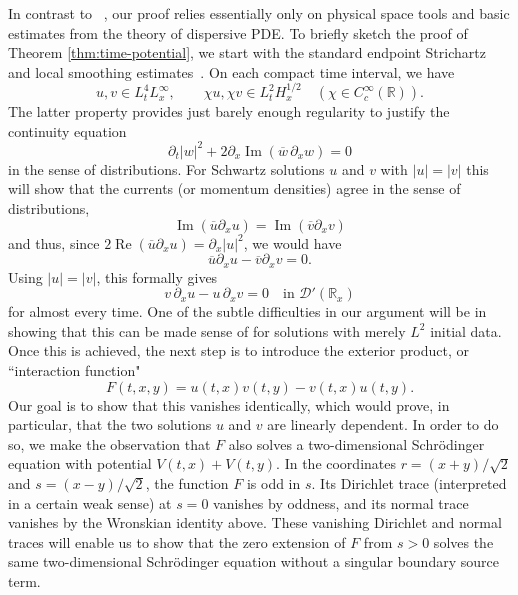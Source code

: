 \documentclass[11pt]{amsart}
\theoremstyle{remark}
\newcommand{\R}{\mathbb R}
\newcommand{\D}{\mathcal D}
\newcommand{\1}{\mathbf 1}
\begin{document}
In contrast to ~\cite{Jaming2025}, our proof relies essentially only on physical space tools and basic estimates from the theory of dispersive PDE. To briefly sketch the proof of Theorem \ref{thm:time-potential}, we start with the standard endpoint Strichartz and local smoothing estimates~\cite{KeelTao,VegaVisciglia}. On each compact time interval,  we have
\[
 u,v\in L^4_tL^\infty_x,
 \qquad
 \chi u,\chi v\in L^2_tH^{1/2}_x
 \quad(\chi\in C_c^\infty(\R)).
\]
The latter property provides just barely enough regularity to justify the continuity equation
\begin{equation}\label{localmass}
\partial_t|w|^2+2\partial_x\operatorname{Im}(\overline w\,\partial_xw)=0
\end{equation}
in the sense of distributions. For Schwartz solutions $u$ and $v$ with $|u|=|v|$ this will show that the currents (or momentum densities) agree in the sense of distributions, 
\begin{equation*}
\operatorname{Im}(\overline{u}\partial_xu)=\operatorname{Im}(\overline{v}\partial_xv)    
\end{equation*}
and thus, since $2\operatorname{Re}(\overline{u}\partial_xu)=\partial_x|u|^2$, we would have
\begin{equation*}
\overline{u}\partial_xu-\overline{v}\partial_xv=0.    
\end{equation*}
Using $|u|=|v|$, this formally gives
\begin{equation*}
v\,\partial_xu-u\,\partial_xv=0
 \quad\text{in }\D'(\R_x)    
\end{equation*}
for almost every time. One of the subtle difficulties in our argument will be in showing that this can be made sense of for solutions with merely $L^2$ initial data. Once this is achieved, the next step is to introduce the exterior product, or ``interaction function"
\[
 F(t,x,y)=u(t,x)v(t,y)-v(t,x)u(t,y).
\]
Our goal is to show that this vanishes identically, which would prove, in particular, that the two solutions $u$ and $v$ are linearly dependent. In order to do so, we make the observation that $F$ also solves a two-dimensional Schr\"odinger equation with potential $V(t,x)+V(t,y)$. In the coordinates $r=(x+y)/\sqrt2$ and $s=(x-y)/\sqrt2$, the function $F$ is odd in $s$. Its Dirichlet trace (interpreted in a certain weak sense) at $s=0$ vanishes by oddness, and its normal trace vanishes by the Wronskian identity above. These vanishing Dirichlet and normal traces will enable us to show that the zero extension of $F$ from $s>0$ solves the same two-dimensional Schr\"odinger equation without a singular boundary source term.
\end{document}
